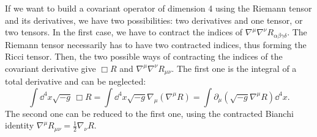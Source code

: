 \documentclass[a4paper,12pt]{book}
\begin{document}
If we want to build a covariant operator of dimension 4 using the Riemann tensor and its derivatives, we have two possibilities: two derivatives and one tensor, or two tensors. In the first case, we have to contract the indices of $\nabla^\mu\nabla^\nu R_{\alpha\beta\gamma\delta}$. The Riemann tensor necessarily has to have two contracted indices, thus forming the Ricci tensor. Then, the two possible ways of contracting the indices of the covariant derivative give $\Box R$ and $\nabla^\mu\nabla^\nu R_{\mu\nu}$. The first one is the integral of a total derivative and can be neglected:
\[\int\dd^4x\sqrt{-g}\,\Box R=\int\dd^4x\sqrt{-g}\nabla_\mu(\nabla^\mu R)=\int\partial_\mu(\sqrt{-g}\nabla^\mu R)\dd^4x.\]
The second one can be reduced to the first one, using the contracted Bianchi identity $\nabla^\mu R_{\mu\nu}=\frac12\nabla_\nu R$.
\end{document}
